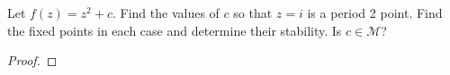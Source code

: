 \begin{problem}{3}
  Let $f(z) = z^2 + c$. Find the values of $c$ so that $z=i$ is a period 2 point.
  Find the fixed points in each case and determine their stability. Is $c \in \mathcal{M}$?
\end{problem}

\begin{proof}
\end{proof}
\newpage
